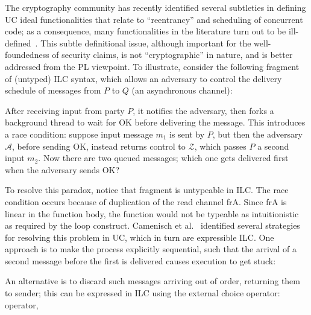 The cryptography community has recently identified several subtleties in defining UC ideal functionalities that relate to ``reentrancy'' and scheduling of concurrent code;
as a consequence, many functionalities in the literature turn out to be ill-defined~\cite{camenisch2016universal}.
This subtle definitional issue, although important for the well-foundedness of security claims,
is not ``cryptographic'' in nature, and is better addressed from the PL viewpoint.
To illustrate, consider the following fragment of (untyped) ILC syntax, which allows an adversary to control the delivery schedule of messages from $P$ to $Q$ (an asynchronous channel):

After receiving input from party $P$, it
notifies the adversary, then forks a background thread to wait for \textsf{OK} before
delivering the message.
This introduces a race condition: suppose input message $m_1$ is sent by $P$, but then the adversary $\mathcal A$, before sending \textsf{OK}, instead returns control to $\mathcal Z$, which passes $P$ a second input $m_2$. Now there are two queued messages; which one gets delivered first when the adversary sends \textsf{OK}?

To resolve this paradox, notice that fragment is untypeable in ILC.
The race condition occurs because of duplication of the read channel \textsf{frA}.
Since \textsf{frA} is linear in the function body, the function would not be typeable as intuitionistic as required by the \textsf{loop} construct.
Camenisch et al.~\cite{camenisch2016universal} identified several strategies for resolving this problem in UC, which in turn are expressible ILC. One approach is to make the process explicitly sequential, such that the arrival of a second message before the first is delivered causes execution to get stuck:

An alternative is to discard such messages arriving out of order, returning them to sender; this can be expressed in ILC using the external choice operator:
operator,

